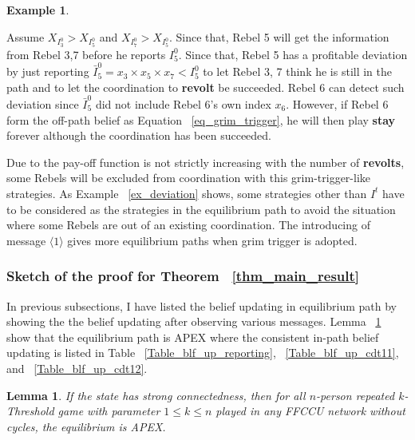\documentclass[12pt,letter]{article}
\newtheorem{lemma}{Lemma}[section]
\theoremstyle{definition}
\newtheorem{example}{Example}[section]
\theoremstyle{remark}
\theoremstyle{claim}
\begin{document}
\begin{example}
\begin{center}
\end{center}

Assume $X_{I^0_3}>X_{I^0_5}$ and $X_{I^0_7}>X_{I^0_5}$. Since that, Rebel 5 will get the information from Rebel 3,7 before he reports $I^0_5$. Since that, Rebel 5 has a profitable deviation by just reporting $\bar{I}^0_5=x_3\times x_5\times x_7<I^0_5$ to let Rebel 3, 7 think he is still in the path and to let the coordination to \textbf{revolt} be succeeded. Rebel 6 can detect such deviation since $\bar{I}^0_5$ did not include Rebel 6's own index $x_6$. However, if Rebel 6 form the off-path belief as Equation ~\ref{eq_grim_trigger}, he will then play \textbf{stay} forever although the coordination has been succeeded.

\end{example}

Due to the pay-off function is not strictly increasing with the number of \textbf{revolts}, some Rebels will be excluded from coordination with this grim-trigger-like strategies. As Example ~\ref{ex_deviation} shows, some strategies other than $I^t$ have to be considered as the strategies in the equilibrium path to avoid the situation where some Rebels are out of an existing coordination. The introducing of message $\langle 1 \rangle$ gives more equilibrium paths when grim trigger is adopted. 

\subsubsection{Sketch of the proof for Theorem ~\ref{thm_main_result}}

In previous subsections, I have listed the belief updating in equilibrium path by showing the the belief updating after observing various messages. Lemma ~\ref{lemma_in_the_path} show that the equilibrium path is APEX where the consistent in-path belief updating is listed in Table ~\ref{Table_blf_up_reporting}, ~\ref{Table_blf_up_cdt11}, and ~\ref{Table_blf_up_cdt12}. 
\begin{lemma}\label{lemma_in_the_path}
If the state has strong connectedness, then for all $n$-person repeated $k$-Threshold game with parameter $1\leq k\leq n$ played in any FFCCU network without cycles, the equilibrium is APEX.
\end{lemma}
\end{document}
